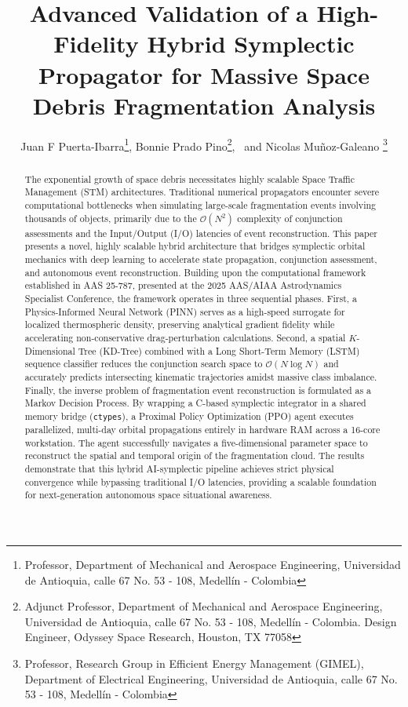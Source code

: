 \documentclass[letterpaper, preprint, 11pt]{AAS}
\begin{document}
\title{Advanced Validation of a High-Fidelity Hybrid Symplectic Propagator for Massive Space Debris Fragmentation Analysis}

\author{Juan F Puerta-Ibarra\thanks{Professor, Department of Mechanical and Aerospace Engineering, Universidad de Antioquia, calle 67 No. 53 - 108, Medellín - Colombia},  
Bonnie Prado Pino\thanks{Adjunct Professor, Department of Mechanical and Aerospace Engineering, Universidad de Antioquia, calle 67 No. 53 - 108, Medellín - Colombia. Design Engineer, Odyssey Space Research, Houston, TX 77058},
\ and Nicolas Muñoz-Galeano \thanks{Professor, Research Group in Efficient Energy Management (GIMEL), Department of Electrical Engineering, Universidad de Antioquia, calle 67 No. 53 - 108, Medellín - Colombia}
}

\maketitle

\begin{abstract}
The exponential growth of space debris necessitates highly scalable Space Traffic Management (STM) architectures. Traditional numerical propagators encounter severe computational bottlenecks when simulating large-scale fragmentation events involving thousands of objects, primarily due to the $\mathcal{O}(N^2)$ complexity of conjunction assessments and the Input/Output (I/O) latencies of event reconstruction. This paper presents a novel, highly scalable hybrid architecture that bridges symplectic orbital mechanics with deep learning to accelerate state propagation, conjunction assessment, and autonomous event reconstruction. Building upon the computational framework established in AAS 25-787, presented at the 2025 AAS/AIAA Astrodynamics Specialist Conference, the framework operates in three sequential phases. First, a Physics-Informed Neural Network (PINN) serves as a high-speed surrogate for localized thermospheric density, preserving analytical gradient fidelity while accelerating non-conservative drag-perturbation calculations. Second, a spatial $K$-Dimensional Tree (KD-Tree) combined with a Long Short-Term Memory (LSTM) sequence classifier reduces the conjunction search space to $\mathcal{O}(N \log N)$ and accurately predicts intersecting kinematic trajectories amidst massive class imbalance. Finally, the inverse problem of fragmentation event reconstruction is formulated as a Markov Decision Process. By wrapping a C-based symplectic integrator in a shared memory bridge (\texttt{ctypes}), a Proximal Policy Optimization (PPO) agent executes parallelized, multi-day orbital propagations entirely in hardware RAM across a 16-core workstation. The agent successfully navigates a five-dimensional parameter space to reconstruct the spatial and temporal origin of the fragmentation cloud. The results demonstrate that this hybrid AI-symplectic pipeline achieves strict physical convergence while bypassing traditional I/O latencies, providing a scalable foundation for next-generation autonomous space situational awareness.
\end{abstract}
\end{document}
